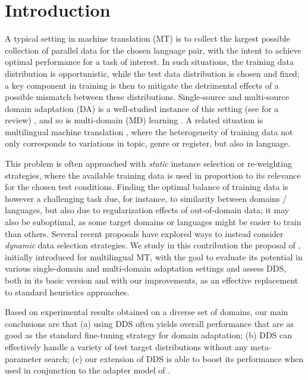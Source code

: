 \documentclass[11pt,a4paper]{article}
\newcommand{\fyTodo}[1]{\Todo[FY:]{\textcolor{orange}{#1}}}
\begin{document}
\section{Introduction}\label{sec:intro}
A typical setting in machine translation (MT) is to collect the largest possible collection of parallel data for the chosen language pair, with the intent to achieve optimal performance for a task of interest. In such situations, the training data distribution is opportunistic, while the test data distribution is chosen and fixed; a key component in training is then to mitigate the detrimental effects of a possible mismatch between these distributions. Single-source and multi-source domain adaptation (DA) is a well-studied instance of this setting (see \cite{Chu2017comparison} for a review) , and so is multi-domain (MD) learning \cite{Chu18multilingual,Zeng18multidomain,Jiang19multidomain,Pham21revisiting}. A related situation is multilingual machine translation \cite{Firat16multiway,Ha16towards,Johnson17google,Arivazhagan19massively}\fyTodo{Add more recent work}, where the heterogeneity of training data not only corresponds to variations in topic, genre or register, but also in language.

\fyTodo{Label or covariate shift ?}
This problem is often approached with \emph{static} instance selection or re-weighting strategies, where the available training data is used in proportion to its relevance for the chosen test conditions. Finding the optimal balance of training data is however a challenging task due, for instance, to similarity between domains / languages, but also due to regularization effects of out-of-domain data; it may also be suboptimal, as some target domains or languages might be easier to train than others. Several recent proposals \cite{Wang17instance,Kumar19reinforcement,Wang20learning-multi} have explored ways to instead consider \emph{dynamic} data selection strategies. We study in this contribution the proposal of \citet{Wang20balancing}, initially introduced for multilingual MT, with the goal to evaluate its potential in various single-domain and multi-domain adaptation settings and assess DDS, both in its basic version and with our improvements, as an effective replacement to standard heuristics approaches.

Based on experimental results obtained on a diverse set of domains, our main conclusions are that (a) using DDS often yields overall performance that are as good as the standard fine-tuning strategy for domain adaptation; (b) DDS can effectively handle a variety of test target distributions without any meta-parameter search; (c) our extension of DDS is able to boost its performance when used in conjunction to the adapter model of \citet{Bapna19simple}.
\end{document}
